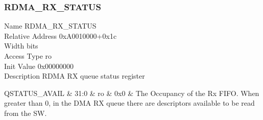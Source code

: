 \documentclass[10pt,a4paper]{paper}
\begin{document}
\subsubsection{RDMA\_RX\_STATUS} \label{reg:rdma_rx_status}
\begin{regdescription}
	Name			\> RDMA\_RX\_STATUS\\
	Relative Address	\> 0xA0010000+0x1c\\
	Width			 bits\\
	Access Type		\> ro\\
	Init Value		\> 0x00000000\\
	Description		\> RDMA RX queue status register\\
\end{regdescription}
\begin{regdetails}
	\hline QSTATUS\_AVAIL & 31:0 & ro & 0x0 & The Occupancy of the Rx FIFO.
	When greater than 0, in the DMA RX queue there are descriptors available
	to be read from the SW.\\
\end{regdetails}
\end{document}
